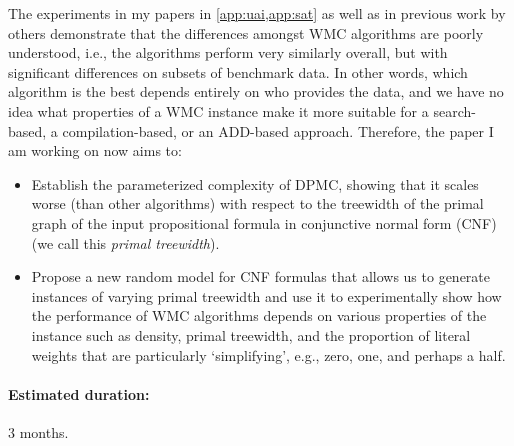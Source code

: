 \documentclass{article}
\begin{document}
The experiments in my papers in \cref{app:uai,app:sat} as well as in previous
work by others \cite{DBLP:conf/aaai/DudekPV20,DBLP:conf/cp/DudekPV20}
demonstrate that the differences amongst WMC algorithms are poorly understood,
i.e., the algorithms perform very similarly overall, but with significant
differences on subsets of benchmark data. In other words, which algorithm is the
best depends entirely on who provides the data, and we have no idea what
properties of a WMC instance make it more suitable for a search-based,
a compilation-based, or an ADD-based approach. Therefore, the paper I am working
on now aims to:
\begin{itemize}
\item Establish the parameterized complexity of DPMC, showing that it scales
  worse (than other algorithms) with respect to the treewidth of the primal
  graph of the input propositional formula in conjunctive normal form (CNF) (we
  call this \emph{primal treewidth}).
\item Propose a new random model for CNF formulas that allows us to generate
  instances of varying primal treewidth and use it to experimentally show how
  the performance of WMC algorithms depends on various properties of the
  instance such as density, primal treewidth, and the proportion of literal
  weights that are particularly `simplifying', e.g., zero, one, and perhaps a
  half.
\end{itemize}

\paragraph{Estimated duration:} 3 months.
\end{document}
